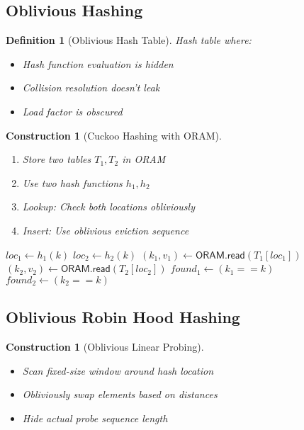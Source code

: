 \documentclass[11pt,final,hidelinks]{article}
\newcommand{\Read}{\mathsf{read}}
\newtheorem{definition}[theorem]{Definition}
\newtheorem{construction}[theorem]{Construction}
\begin{document}
\subsection{Oblivious Hashing}

\begin{definition}[Oblivious Hash Table]
Hash table where:
\begin{itemize}
    \item Hash function evaluation is hidden
    \item Collision resolution doesn't leak
    \item Load factor is obscured
\end{itemize}
\end{definition}

\begin{construction}[Cuckoo Hashing with ORAM]
\begin{enumerate}
    \item Store two tables $T_1, T_2$ in ORAM
    \item Use two hash functions $h_1, h_2$
    \item Lookup: Check both locations obliviously
    \item Insert: Use oblivious eviction sequence
\end{enumerate}
\begin{algorithm}[H]
\caption{Oblivious Cuckoo Lookup}
$loc_1 \gets h_1(k)$\;
$loc_2 \gets h_2(k)$\;
$(k_1, v_1) \gets \mathsf{ORAM}.\Read(T_1[loc_1])$\;
$(k_2, v_2) \gets \mathsf{ORAM}.\Read(T_2[loc_2])$\;
$found_1 \gets (k_1 == k)$\;
$found_2 \gets (k_2 == k)$\;
\end{algorithm}
\end{construction}

\subsection{Oblivious Robin Hood Hashing}

\begin{construction}[Oblivious Linear Probing]
\begin{itemize}
    \item Scan fixed-size window around hash location
    \item Obliviously swap elements based on distances
    \item Hide actual probe sequence length
\end{itemize}
\end{construction}
\end{document}
